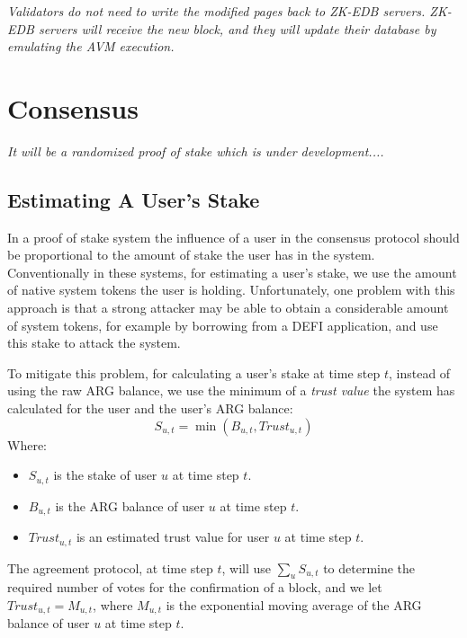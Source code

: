 \documentclass[a4paper]{report}
\newcommand{\note}[1] {
    \begin{tcolorbox}[colframe=white,colback=white]
        \emph{#1}
    \end{tcolorbox}
}
\begin{document}
    \note{Validators do not need to write the modified pages back to ZK-EDB servers. ZK-EDB servers will receive the new
    block, and they will update their database by emulating the AVM execution.}


    \section{Consensus}\label{sec:consensus}

    \note{It will be a randomized proof of stake which is under development....}

    \subsection{Estimating A User's Stake}\label{subsec:estimating-a-user's-stake}

    In a proof of stake system the influence of a user in the consensus protocol should be proportional to the amount
    of stake the user has in the system. Conventionally in these systems, for estimating a user's stake, we use the
    amount of native system tokens the user is holding. Unfortunately, one problem with this approach is that a
    strong attacker may be able to obtain a considerable amount of system tokens, for example by borrowing from a
    DEFI application, and use this stake to attack the system.

    To mitigate this problem, for calculating a user's stake at time step \(t\), instead of using the raw ARG
    balance, we use the minimum of a \emph{trust value} the system has calculated for the user and the user's
    ARG balance:
    \[
        S_{u,t} = \min (B_{u,t}, Trust_{u,t})
    \]
    Where:
    \begin{itemize}
        \item \(S_{u,t}\) is the stake of user \(u\) at time step \(t\).
        \item \(B_{u,t}\) is the ARG balance of user \(u\) at time step \(t\).
        \item \(Trust_{u,t}\) is an estimated trust value for user \(u\) at time step \(t\).
    \end{itemize}

    The agreement protocol, at time step \(t\), will use \(\sum_{u}S_{u,t}\) to determine the required
    number of votes for the confirmation of a block, and we let \(Trust_{u,t} = M_{u,t}\), where \(M_{u,t}\) is the
    exponential moving average of the ARG balance of user \(u\) at time step \(t\).
\end{document}
